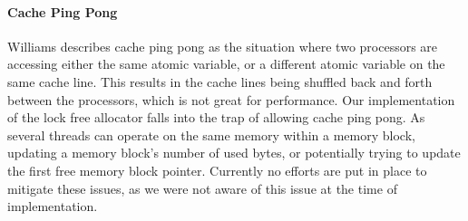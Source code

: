 \paragraph{Cache Ping Pong}
\label{par:detailed_lock_free_ping_pong}
Williams\cite{williams_safety_off} describes cache ping pong as the situation where two processors
are accessing either the same atomic variable, or a different atomic variable on the same cache line.
This results in the cache lines being shuffled back and forth between the processors, which is not great for performance.
Our implementation of the lock free allocator falls into the trap of allowing cache ping pong.
As several threads can operate on the same memory within a memory block, updating a memory block's number of used bytes, or
potentially trying to update the first free memory block pointer.
Currently no efforts are put in place to mitigate these issues, as we were not aware of this issue at the time of implementation.
